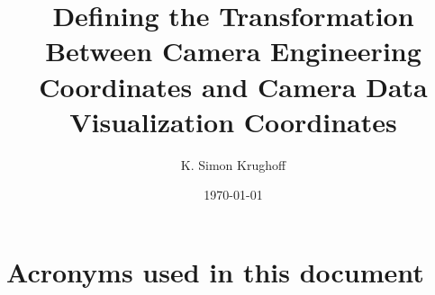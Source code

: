 \documentclass[SE,lsstdraft,toc]{lsstdoc}
\title{Defining the Transformation Between Camera Engineering Coordinates and Camera Data Visualization Coordinates}
\author{%
K. Simon Krughoff
}
\date{\today}
\begin{document}
\maketitle





\appendix


\section{Acronyms used in this document}\label{sec:acronyms}

\end{document}
